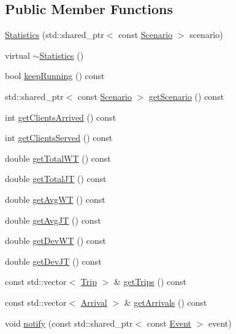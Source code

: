 \subsection*{Public Member Functions}
\begin{DoxyCompactItemize}
\item 
\hyperlink{class_statistics_affbe803d713a70b26d450879049fc40c}{Statistics} (std\+::shared\+\_\+ptr$<$ const \hyperlink{class_scenario}{Scenario} $>$ scenario)
\item 
virtual \hyperlink{class_statistics_ab68ede75479e44d5c35b78ec1284065b}{$\sim$\+Statistics} ()
\item 
bool \hyperlink{class_statistics_a13b7527baab6a472c7444a0ab5f4cf20}{keep\+Running} () const 
\item 
std\+::shared\+\_\+ptr$<$ const \hyperlink{class_scenario}{Scenario} $>$ \hyperlink{class_statistics_a917c7263fd8f43a6dbb42548cb307113}{get\+Scenario} () const 
\item 
int \hyperlink{class_statistics_a62124212973c28f1b46f51bdc4ae9472}{get\+Clients\+Arrived} () const 
\item 
int \hyperlink{class_statistics_ac226bbe5bf342f9c0da5cf3e205492f1}{get\+Clients\+Served} () const 
\item 
double \hyperlink{class_statistics_aa9a9a9daa51c577da9732823b8720ac4}{get\+Total\+W\+T} () const 
\item 
double \hyperlink{class_statistics_afe9ebbfbf81e5abee5080eea6f586731}{get\+Total\+J\+T} () const 
\item 
double \hyperlink{class_statistics_a5ed129f73662604d79465dade30577cc}{get\+Avg\+W\+T} () const 
\item 
double \hyperlink{class_statistics_a5921e47905fd106e6030066456a31a10}{get\+Avg\+J\+T} () const 
\item 
double \hyperlink{class_statistics_ad855ad97545c2edcc2f344efe8f8d152}{get\+Dev\+W\+T} () const 
\item 
double \hyperlink{class_statistics_a7f560ff5b5c152e06a3e5e831455da91}{get\+Dev\+J\+T} () const 
\item 
const std\+::vector$<$ \hyperlink{struct_trip}{Trip} $>$ \& \hyperlink{class_statistics_a38e0cef8c314aa51948e7889831e3894}{get\+Trips} () const 
\item 
const std\+::vector$<$ \hyperlink{struct_arrival}{Arrival} $>$ \& \hyperlink{class_statistics_a12ae4864b00ec11dcbf92af52703473f}{get\+Arrivals} () const 
\item 
void \hyperlink{class_statistics_a75d0a1191341fe95e94bf50a6b69a5a3}{notify} (const std\+::shared\+\_\+ptr$<$ const \hyperlink{class_event}{Event} $>$ event)

\end{DoxyCompactItemize}
